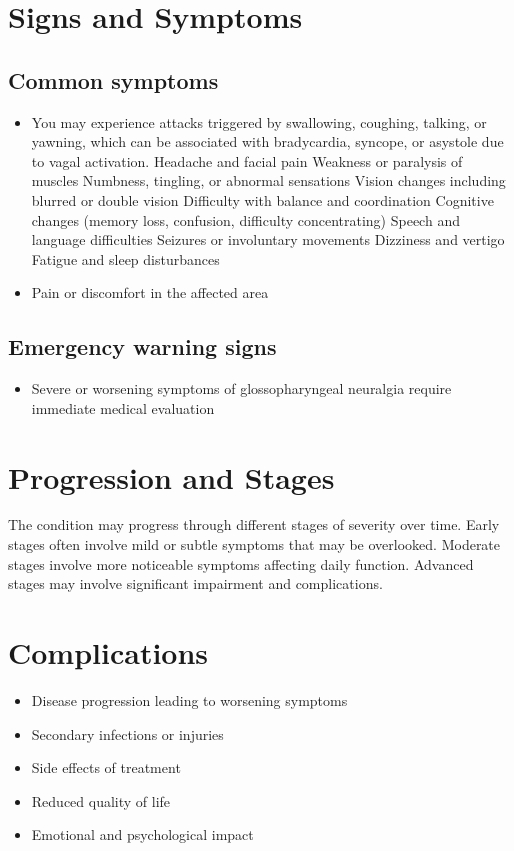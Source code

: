 \section{Signs and Symptoms}
\subsection{Common symptoms}
\begin{itemize}[noitemsep]
  \item You may experience attacks triggered by swallowing, coughing, talking, or yawning, which can be associated with bradycardia, syncope, or asystole due to vagal activation. Headache and facial pain Weakness or paralysis of muscles Numbness, tingling, or abnormal sensations Vision changes including blurred or double vision Difficulty with balance and coordination Cognitive changes (memory loss, confusion, difficulty concentrating) Speech and language difficulties Seizures or involuntary movements Dizziness and vertigo Fatigue and sleep disturbances
  \item Pain or discomfort in the affected area
  \end{itemize}
\subsection{Emergency warning signs}
\begin{itemize}[noitemsep]
  \item Severe or worsening symptoms of glossopharyngeal neuralgia require immediate medical evaluation
\end{itemize}
\section{Progression and Stages}
The condition may progress through different stages of severity over time. Early stages often involve mild or subtle symptoms that may be overlooked. Moderate stages involve more noticeable symptoms affecting daily function. Advanced stages may involve significant impairment and complications.
\section{Complications}
\begin{itemize}[noitemsep]
  \item Disease progression leading to worsening symptoms
  \item Secondary infections or injuries
  \item Side effects of treatment
  \item Reduced quality of life
  \item Emotional and psychological impact
\end{itemize}
